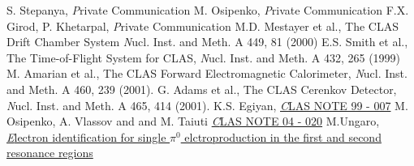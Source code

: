 \begin{thebibliography}{mybib}
     {S. Stepanya},              {\textit Private Communication}
       {M. Osipenko},              {\textit Private Communication}
     {F.X. Girod, P. Khetarpal}, {\textit Private Communication}
           {M.D. Mestayer et al.}, The CLAS Drift Chamber System                 {\textit Nucl. Inst. and Meth. A 449, 81 (2000)}
         {E.S. Smith et al.},    The Time-of-Flight System for CLAS,           {\textit Nucl. Inst. and Meth. A 432, 265 (1999)}
           {M. Amarian et al.},    The CLAS Forward Electromagnetic Calorimeter, {\textit Nucl. Inst. and Meth. A 460, 239 (2001).}
           {G. Adams et al.},      The CLAS Cerenkov Detector,                   {\textit Nucl. Inst. and Meth. A 465, 414 (2001).}
        {K.S. Egiyan},              \href{http://www.jlab.org/Hall-B/notes/clas_notes99/ec_thresh.ps}          {\textit CLAS NOTE 99 - 007}
                       {M. Osipenko, A. Vlassov and and M. Taiuti } \href{http://www1.jlab.org/ul/Physics/Hall-B/clas/public/2004-020.pdf}     {\textit CLAS NOTE 04 - 020}
     {M.Ungaro},                                  \href{https://maureeungaro.github.io/home/meson/pi0_resonance/electron_id} {\textit Electron identification for single $\pi^0$ elctroproduction in the first and second resonance regions}
\end{thebibliography}
